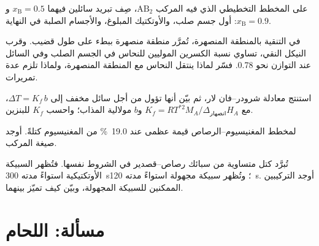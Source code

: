 \begin{exercise}[$\star\star$]\label{exo:b2:solid-liquid-diagrams:8}
على المخطط التخطيطي الذي فيه المركب $\mathrm{AB_2}$، صِف
تبريد سائلين فيهما $x_{\mathrm B} = 0.5$ و$x_{\mathrm B} = 0.9$: أول
جسم صلب، والأوتكتيك المبلوغ، والأجسام الصلبة في النهاية.
\end{exercise}

\begin{exercise}[$\star\star$]\label{exo:b2:solid-liquid-diagrams:9}
في التنقية بالمنطقة المنصهرة، تُمرَّر منطقة منصهرة ببطء على طول قضيب. وقرب النيكل النقي،
تساوي نسبة الكسرين الموليين للنحاس في الجسم الصلب وفي السائل عند
التوازن نحو 0.78. فسّر لماذا ينتقل النحاس مع
المنطقة المنصهرة، ولماذا تلزم عدة تمريرات.
\end{exercise}

\begin{exercise}[$\star\star\star$]\label{exo:b2:solid-liquid-diagrams:10}
استنتج معادلة شرودر--فان لار، ثم بيّن أنها تؤول من أجل سائل مخفف
إلى $\Delta T = K_f\,b$، مع $K_f = RT^{*2}M_A/\Delta_{\text{انصهار}}H_A$
و$b$ مولالية المذاب؛ واحسب $K_f$ للبنزين.
\end{exercise}

\begin{exercise}[$\star\star\star$]\label{exo:b2:solid-liquid-diagrams:11}
لمخطط المغنيسيوم--الرصاص قيمة عظمى  عند 19.0~\% من المغنيسيوم
كتلةً. أوجد صيغة المركب.
\end{exercise}

\begin{exercise}[$\star\star\star$]\label{exo:b2:solid-liquid-diagrams:12}
تُبرَّد كتل متساوية من سبائك رصاص--قصدير في الشروط نفسها. فتُظهر
السبيكة الأوتكتيكية استواءً مدته \qty{300}{s}؛ وتُظهر سبيكة مجهولة استواءً مدته
\qty{120}{s}. أوجد التركيبين الممكنين للسبيكة المجهولة، وبيّن كيف
تميّز بينهما.
\end{exercise}

\section{مسألة: اللحام}

